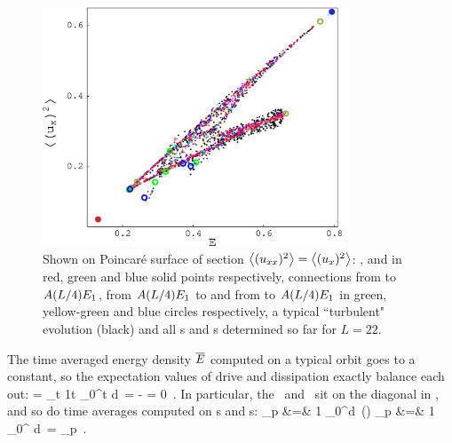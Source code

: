 \begin{figure}[t] \label{f:drivedragPoinc}
\begin{center}
    \includegraphics[width=0.8\textwidth]{figs/energyPoinc.eps}
\end{center}
\caption{
Shown on Poincar\'{e} surface of section $\left\langle {(u_{xx})^2} \right\rangle = \left\langle {(u_{x})^2} \right\rangle$:
,  and  in red, green and blue solid points respectively,
connections from  to $A(L/4)E_{1}$,
from $A(L/4)E_{1}$ to  and from  to $A(L/4)E_{1}$ in green, 
yellow-green and blue circles respectively,
a typical ``turbulent" evolution (black) and all \po s and \rpo s 
determined so far for $L=22$.
        }
\end{figure}


The time averaged energy density  $\overline{E}$
computed on a typical orbit goes to a constant, so
the expectation values  of drive and dissipation
exactly balance each out:
\beq
      =
    \lim_{t\rightarrow \infty}
        {1\over t} \int_0^t d\tau \, \dot{\expctE}
=
       - 
= 0
    \,.
In particular, the \eqva\
and \reqva\ sit on the diagonal in ,
and so do time averages computed on \po s and \rpo s:
\bea
{}_p &=&
{1\over {}} \int_0^d\tau \, \expctE(\tau)
    \continue
{}_p &=&
{1\over {}} \int_0^ d\tau \, 
    =
      _p
    \,.
\label{poE}
\eea

